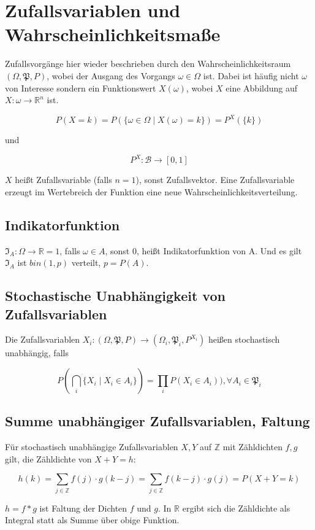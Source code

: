 \documentclass{scrartcl}%
\begin{document}
\section{Zufallsvariablen und Wahrscheinlichkeitsmaße}
Zufallsvorgänge hier wieder beschrieben durch den Wahrscheinlichkeitsraum $(\Omega, \mathfrak{P}, P)$, wobei der Ausgang des Vorgangs $\omega \in \Omega$ ist. Dabei ist häufig nicht $\omega$ von Interesse sondern ein Funktionswert $X(\omega)$, wobei $X$ eine Abbildung auf $X: \omega \rightarrow \mathbb{R}^n$ ist.

\[P(X = k) = P(\{\omega \in \Omega \mid X(\omega) = k\}) = P^X (\{k\}) \]

und

\[P^X: \mathcal{B} \rightarrow [0,1]\]

$X$ heißt Zufallsvariable (falls $n = 1$), sonst Zufallsvektor. Eine Zufallsvariable erzeugt im Wertebreich der Funktion eine neue Wahrscheinlichkeitsverteilung.

\subsection{Indikatorfunktion}
$\mathfrak{I}_A: \Omega \rightarrow \mathbb{R} = 1$, falls $\omega \in A$, sonst $0$, heißt Indikatorfunktion von A. Und es gilt $\mathfrak{I}_A$ ist $bin(1,p)$ verteilt, $p = P(A)$.  

\subsection{Stochastische Unabhängigkeit von Zufallsvariablen}
Die Zufallsvariablen $X_i: (\Omega, \mathfrak{P},P) \rightarrow (\Omega_i, \mathfrak{P}_i, P^{X_i})$ heißen stochastisch unabhängig, falls

\[ P(\bigcap\limits_i \{X_i \mid X_i \in A_i\}) = \prod\limits_i P (X_i \in A_i)), \forall A_i \in \mathfrak{P}_i \]

\subsection{Summe unabhängiger Zufallsvariablen, Faltung}
Für stochastisch unabhängige Zufallsvariablen $X,Y$ auf $\mathbb{Z}$ mit Zähldichten $f,g$ gilt, die Zähldichte von $X+Y = h$:

\[h(k) = \sum\limits_{j \in \mathbb{Z}} f(j) \cdot g(k-j) = \sum\limits_{j \in \mathbb{Z}}f(k-j) \cdot g(j) = P(X+Y = k)\]

$h = f*g$ ist Faltung der Dichten $f$ und $g$. In $\mathbb{R}$ ergibt sich die Zähldichte als Integral statt als Summe über obige Funktion.
\end{document}
